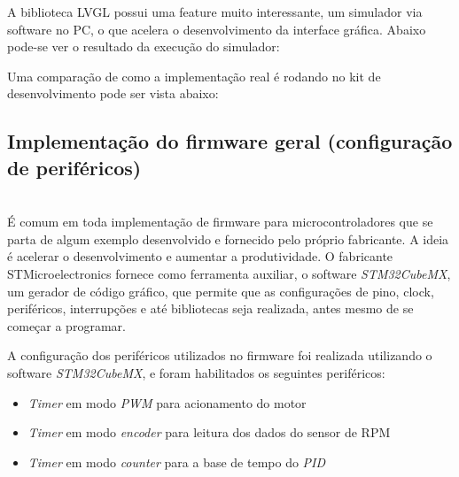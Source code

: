 \documentclass[times, twoside, watermark]{artigo}
\begin{document}
A biblioteca LVGL possui uma feature muito interessante, um simulador via software no PC, o que acelera o desenvolvimento da interface gráfica. Abaixo pode-se ver o resultado da execução do simulador:





Uma comparação de como a implementação real é rodando no kit de desenvolvimento pode ser vista abaixo:



\subsection{Implementação do firmware geral (configuração de periféricos)}\hfill\\
É comum em toda implementação de firmware para microcontroladores que se parta de algum exemplo desenvolvido e fornecido pelo próprio fabricante. A ideia é acelerar o desenvolvimento e aumentar a produtividade. O fabricante STMicroelectronics fornece como ferramenta auxiliar, o software \textit{STM32CubeMX}, um gerador de código gráfico, que permite que as configurações de pino, clock, periféricos, interrupções e até bibliotecas seja realizada, antes mesmo de se começar a programar.


A configuração dos periféricos utilizados no firmware foi realizada utilizando o software \textit{STM32CubeMX}, e foram habilitados os seguintes periféricos:

\begin{itemize}
    \item \textit{Timer} em modo \textit{PWM} para acionamento do motor
    \item \textit{Timer} em modo \textit{encoder} para leitura dos dados do sensor de RPM
    \item \textit{Timer} em modo \textit{counter} para a base de tempo do \textit{PID}
\end{itemize}
\end{document}
